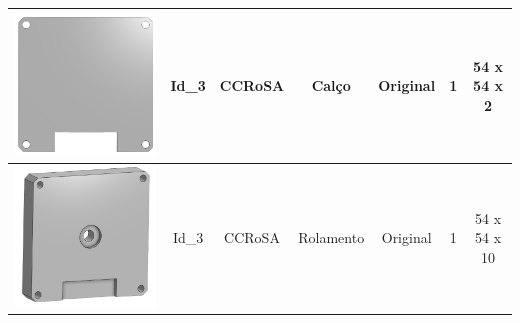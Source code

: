 \documentclass[
12pt,					%
openright,				%
twoside,				%
a4paper,				%
english,
brazil
]{ABNT/abntex2_report}
\begin{document}
\begin{table}[H]
\begin{adjustbox}{max width=\textwidth}
\begin{tabular}{|c|c|c|c|c|c|c|}
		\includegraphics[scale=0.12]{appendix/calco.png}                 & Id\_3 & CCRoSA         & Calço               & Original             & 1          & 54 x 54 x 2           \\ \hline
		\rowcolor[HTML]{EFEFEF} 
		\includegraphics[scale = 0.12]{appendix/rolamentoorigi.png}        & Id\_3 & CCRoSA         & Rolamento           & Original             & 1          & 54 x 54 x 10          \\ \hline

\end{tabular}
\end{adjustbox}
\end{table}
\end{document}

